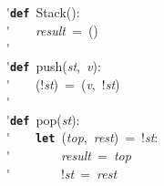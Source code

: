 \'\>\texttt{\textbf{def}}~Stack():\\

\'\>~~~~\textit{result}~=~()\\

\'\>\\

\'\>\texttt{\textbf{def}}~push(\textit{st},~\textit{v}):\\

\'\>~~~~(!\textit{st})~=~(\textit{v},~!\textit{st})\\

\'\>\\

\'\>\texttt{\textbf{def}}~pop(\textit{st}):\\

\'\>~~~~\texttt{\textbf{let}}~(\textit{top},~\textit{rest})~=~!\textit{st}:\\

\'\>~~~~~~~~\textit{result}~=~\textit{top}\\

\'\>~~~~~~~~!\textit{st}~=~\textit{rest}